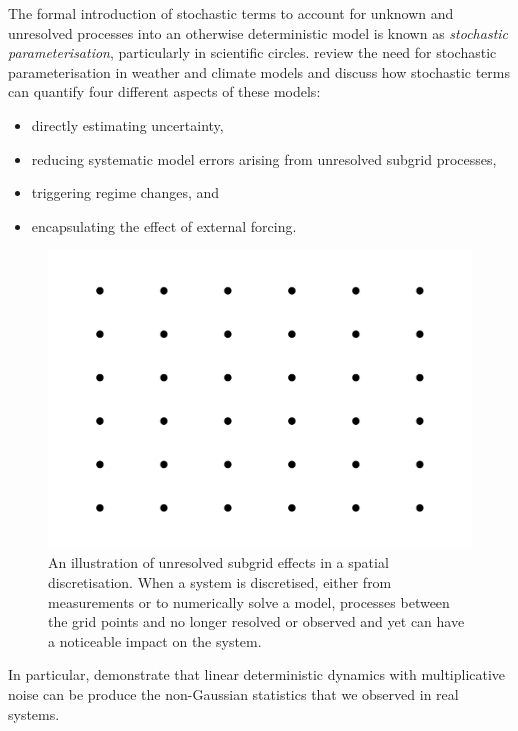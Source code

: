 The formal introduction of stochastic terms to account for unknown and unresolved processes into an otherwise deterministic model is known as \emph{stochastic parameterisation}, particularly in scientific circles.
\citet{BernerEtAl_2017_StochasticParameterizationNew} review the need for stochastic parameterisation in weather and climate models and discuss how stochastic terms can quantify four different aspects of these models:
\begin{itemize}
	\item directly estimating uncertainty,
	\item reducing systematic model errors arising from unresolved subgrid processes,
	\item triggering regime changes, and
	\item encapsulating the effect of external forcing.
\end{itemize}


\begin{figure}
	\begin{center}
		\includegraphics[width=\textwidth]{chp02_background/figures/gridpoints.pdf}
		\caption{An illustration of unresolved subgrid effects in a spatial discretisation.
			When a system is discretised, either from measurements or to numerically solve a model, processes between the grid points and no longer resolved or observed and yet can have a noticeable impact on the system.}
		\label{fig:subgrid_effects}
	\end{center}
\end{figure}


In particular, \citet{SuraEtAl_2005_MultiplicativeNoiseNonGaussianity} demonstrate that linear deterministic dynamics with multiplicative noise can be produce the non-Gaussian statistics that we observed in real systems.

